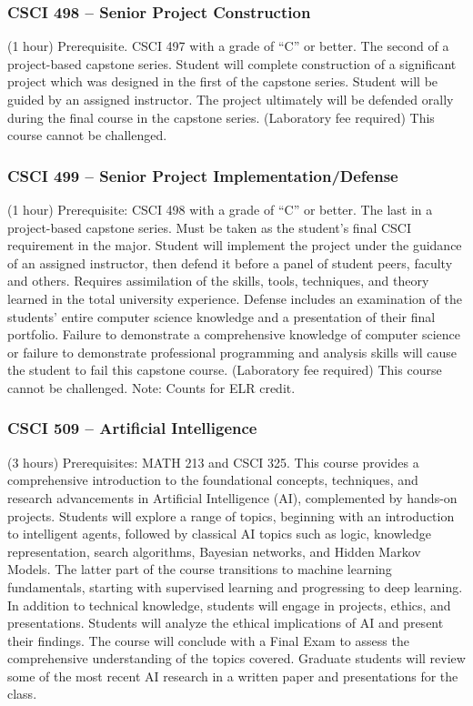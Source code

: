 \subsubsection{CSCI 498 -- Senior Project Construction}%
\label{course:CSCI:498}
(1 hour) Prerequisite. CSCI 497 with a grade of “C” or better. The second of a project-based capstone series. Student will complete construction of a significant project which was designed in the first of the capstone series. Student will be guided by an assigned instructor. The project ultimately will be defended orally during the final course in the capstone series. (Laboratory fee required) This course cannot be challenged.


\subsubsection{CSCI 499 -- Senior Project Implementation/Defense}%
\label{course:CSCI:499}
(1 hour) Prerequisite: CSCI 498 with a grade of “C” or better. The last in a project-based capstone series. Must be taken as the student’s final CSCI requirement in the major. Student will implement the project under the guidance of an assigned instructor, then defend it before a panel of student peers, faculty and others. Requires assimilation of the skills, tools, techniques, and theory learned in the total university experience. Defense includes an examination of the students’ entire computer science knowledge and a presentation of their final portfolio. Failure to demonstrate a comprehensive knowledge of computer science or failure to demonstrate professional programming and analysis skills will cause the student to fail this capstone course. (Laboratory fee required) This course cannot be challenged. Note: Counts for ELR credit.

\subsubsection{CSCI 509 -- Artificial Intelligence}%
\label{course:CSCI:509}
(3 hours) Prerequisites: MATH 213  and CSCI 325. This course provides a comprehensive introduction to the foundational concepts, techniques, and research advancements in Artificial Intelligence (AI), complemented by hands-on projects. Students will explore a range of topics, beginning with an introduction to intelligent agents, followed by classical AI topics such as logic, knowledge representation, search algorithms, Bayesian networks, and Hidden Markov Models. The latter part of the course transitions to machine learning fundamentals, starting with supervised learning and progressing to deep learning. In addition to technical knowledge, students will engage in projects, ethics, and presentations. Students will analyze the ethical implications of AI and present their findings. The course will conclude with a Final Exam to assess the comprehensive understanding of the topics covered. Graduate students will review some of the most recent AI research in a written paper and presentations for the class.


